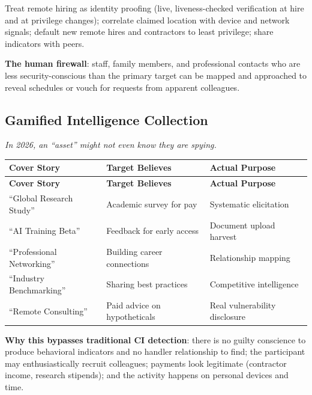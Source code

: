 \documentclass[11pt,letterpaper]{article}
\begin{document}
\begin{recbox}
Treat remote hiring as identity proofing (live, liveness-checked verification at hire and at privilege changes); correlate claimed location with device and network signals; default new remote hires and contractors to least privilege; share indicators with peers.
\end{recbox}

\textbf{The human firewall}: staff, family members, and professional contacts who are less security-conscious than the primary target can be mapped and approached to reveal schedules or vouch for requests from apparent colleagues.

\subsection{Gamified Intelligence Collection}

\textit{In 2026, an ``asset'' might not even know they are spying.}

{\small
\begin{longtable}{L{3.5cm}L{4cm}L{5cm}}
\toprule
\textbf{Cover Story} & \textbf{Target Believes} & \textbf{Actual Purpose} \\
\midrule
\endfirsthead
\toprule
\textbf{Cover Story} & \textbf{Target Believes} & \textbf{Actual Purpose} \\
\midrule
\endhead
``Global Research Study'' & Academic survey for pay & Systematic elicitation \\*
``AI Training Beta'' & Feedback for early access & Document upload harvest \\
``Professional Networking'' & Building career connections & Relationship mapping \\
``Industry Benchmarking'' & Sharing best practices & Competitive intelligence \\*
``Remote Consulting'' & Paid advice on hypotheticals & Real vulnerability disclosure \\
\bottomrule
\end{longtable}}

\textbf{Why this bypasses traditional CI detection}: there is no guilty conscience to produce behavioral indicators and no handler relationship to find; the participant may enthusiastically recruit colleagues; payments look legitimate (contractor income, research stipends); and the activity happens on personal devices and time.
\end{document}
